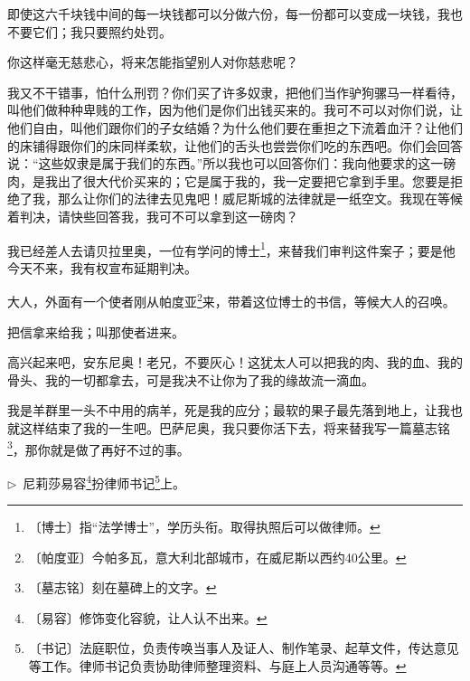 \documentclass[12pt,UTF-8,openany]{ctexbook}
\begin{document}
\begin{normalsize}
\begin{description}[itemsep=1ex,leftmargin=4.5em,labelwidth=4em]
    \item[{\color{script-1-3} 沙义洛}]即使这六千块钱中间的每一块钱都可以分做六份，每一份都可以变成一块钱，我也不要它们；我只要照约处罚。
    
    \item[{\color{script-1-0} 公爵}]你这样毫无慈悲心，将来怎能指望别人对你慈悲呢？
    
    \item[{\color{script-1-3} 沙义洛}]我又不干错事，怕什么刑罚？你们买了许多奴隶，把他们当作驴狗骡马一样看待，叫他们做种种卑贱的工作，因为他们是你们出钱买来的。我可不可以对你们说，让他们自由，叫他们跟你们的子女结婚？为什么他们要在重担之下流着血汗？让他们的床铺得跟你们的床同样柔软，让他们的舌头也尝尝你们吃的东西吧。你们会回答说：“这些奴隶是属于我们的东西。”所以我也可以回答你们：我向他要求的这一磅肉，是我出了很大代价买来的；它是属于我的，我一定要把它拿到手里。您要是拒绝了我，那么让你们的法律去见鬼吧！威尼斯城的法律就是一纸空文。我现在等候着判决，请快些回答我，我可不可以拿到这一磅肉？
    
    \item[{\color{script-1-0} 公爵}]我已经差人去请贝拉里奥，一位有学问的博士\footnote{〔博士〕指“法学博士”，学历头衔。取得执照后可以做律师。}，来替我们审判这件案子；要是他今天不来，我有权宣布延期判决。
    
    \item[{\color{script-1-2} 萨拉里诺}]大人，外面有一个使者刚从帕度亚\footnote{〔帕度亚〕今帕多瓦，意大利北部城市，在威尼斯以西约40公里。}来，带着这位博士的书信，等候大人的召唤。
    
    \item[{\color{script-1-0} 公爵}]把信拿来给我；叫那使者进来。
    
    \item[{\color{script-1-4} 巴萨尼奥}]高兴起来吧，安东尼奥！老兄，不要灰心！这犹太人可以把我的肉、我的血、我的骨头、我的一切都拿去，可是我决不让你为了我的缘故流一滴血。
    
    \item[{\color{script-1-1} 安东尼奥}]我是羊群里一头不中用的病羊，死是我的应分；最软的果子最先落到地上，让我也就这样结束了我的一生吧。巴萨尼奥，我只要你活下去，将来替我写一篇墓志铭\footnote{〔墓志铭〕刻在墓碑上的文字。}，那你就是做了再好不过的事。
    
    \end{description}
    
    \noindent $\triangleright$~尼莉莎易容\footnote{〔易容〕修饰变化容貌，让人认不出来。}扮律师书记\footnote{〔书记〕法庭职位，负责传唤当事人及证人、制作笔录、起草文件，传达意见等工作。律师书记负责协助律师整理资料、与庭上人员沟通等等。}上。
    

\end{normalsize}
\end{document}
